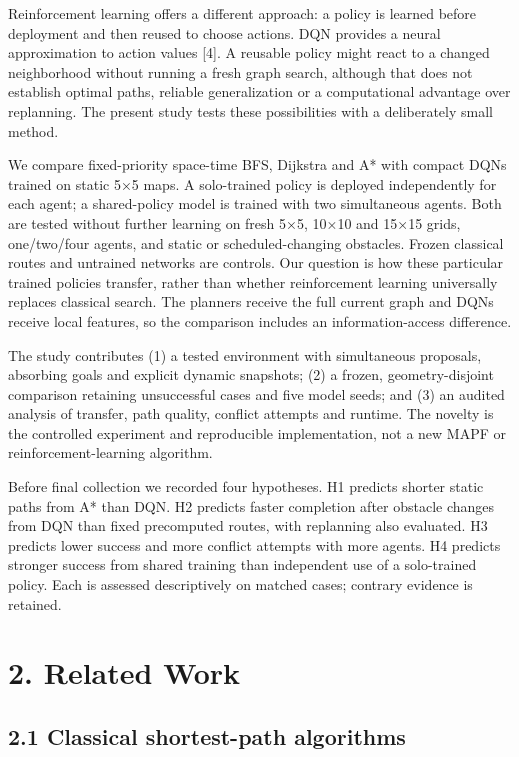 \documentclass[10pt,a4paper]{article}
\begin{document}
Reinforcement learning offers a different approach: a policy is learned before
deployment and then reused to choose actions. DQN provides a neural approximation
to action values [4]. A reusable policy might react to a changed neighborhood
without running a fresh graph search, although that does not establish optimal
paths, reliable generalization or a computational advantage over replanning.
The present study tests these possibilities with a deliberately small method.

We compare fixed-priority space-time BFS, Dijkstra and A* with compact DQNs trained
on static 5×5 maps. A solo-trained policy is deployed independently for each
agent; a shared-policy model is trained with two simultaneous agents. Both are
tested without further learning on fresh 5×5, 10×10 and 15×15 grids, one/two/four
agents, and static or scheduled-changing obstacles. Frozen classical routes and
untrained networks are controls. Our question is how these particular trained
policies transfer, rather than whether reinforcement learning universally replaces
classical search. The planners receive the full current graph and DQNs receive
local features, so the comparison includes an information-access difference.

The study contributes (1) a tested environment with simultaneous proposals,
absorbing goals and explicit dynamic snapshots; (2) a frozen, geometry-disjoint
comparison retaining unsuccessful cases and five model seeds; and (3) an audited
analysis of transfer, path quality, conflict attempts and runtime. The novelty is
the controlled experiment and reproducible implementation, not a new MAPF or
reinforcement-learning algorithm.

Before final collection we recorded four hypotheses. H1 predicts shorter static
paths from A* than DQN. H2 predicts faster completion after obstacle changes from
DQN than fixed precomputed routes, with replanning also evaluated. H3 predicts
lower success and more conflict attempts with more agents. H4 predicts stronger
success from shared training than independent use of a solo-trained policy.
Each is assessed descriptively on matched cases; contrary evidence is retained.

\section*{2. Related Work}

\subsection*{2.1 Classical shortest-path algorithms}
\end{document}
